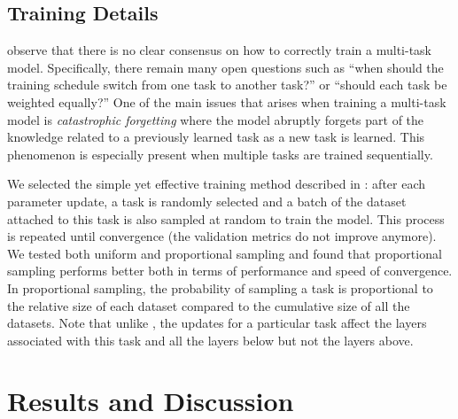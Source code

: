 \documentclass[letterpaper]{article}
\begin{document}
\subsection{Training Details}
\label{subsec:training}

\citeauthor{Subramanian2018}  observe that there is no clear consensus on how to correctly train a multi-task model. Specifically, there remain many open questions such as ``when should the training schedule switch from one task to another task?'' or ``should each task be weighted equally?'' One of the main issues that arises when training a multi-task model is \textit{catastrophic forgetting} \cite{French1999} where the model abruptly forgets part of the knowledge related to a previously learned task as a new task is learned. This phenomenon is especially present when multiple tasks are trained sequentially.

We selected the simple yet effective training method described in \cite{Sogaard2016,Ruder2017c}: after each parameter update, a task is randomly selected and a batch of the dataset attached to this task is also sampled at random to train the model. This process is repeated until convergence (the validation metrics do not improve anymore). We tested both uniform and proportional sampling and found that proportional sampling performs better both in terms of performance and speed of convergence. In proportional sampling, the probability of sampling a task is proportional to the relative size of each dataset compared to the cumulative size of all the datasets. Note that unlike \cite{Subramanian2018}, the updates for a particular task affect the layers associated with this task and all the layers below but not the layers above.

\section{Results and Discussion}
\end{document}
